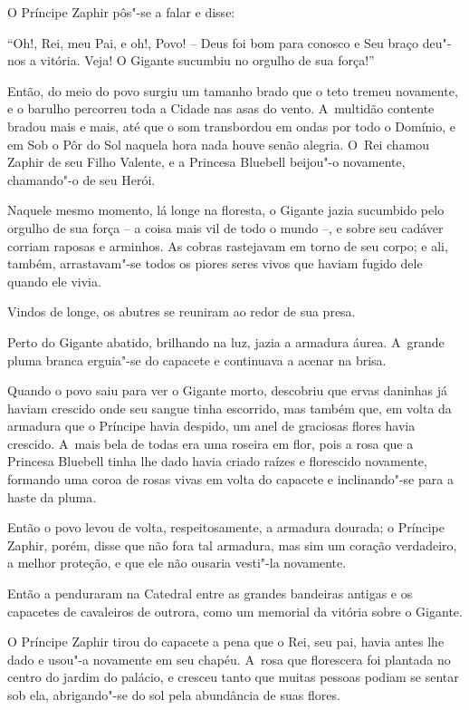 O Príncipe Zaphir pôs"-se a falar e disse:

``Oh!, Rei, meu Pai, e oh!, Povo! -- Deus foi bom para conosco e Seu
braço deu"-nos a vitória. Veja! O Gigante sucumbiu no orgulho de sua
força!''

Então, do meio do povo surgiu um tamanho brado que o teto tremeu
novamente, e o barulho percorreu toda a Cidade nas asas do vento. A~multidão contente bradou mais e mais, até que o som transbordou em ondas
por todo o Domínio, e em Sob o Pôr do Sol naquela hora nada houve senão
alegria. O~Rei chamou Zaphir de seu Filho Valente, e a Princesa Bluebell
beijou"-o novamente, chamando"-o de seu Herói.

Naquele mesmo momento, lá longe na floresta, o Gigante jazia sucumbido
pelo orgulho de sua força -- a coisa mais vil de todo o mundo --, e
sobre seu cadáver corriam raposas e arminhos. As cobras rastejavam em
torno de seu corpo; e ali, também, arrastavam"-se todos os piores seres
vivos que haviam fugido dele quando ele vivia.

Vindos de longe, os abutres se reuniram ao redor de sua presa.

Perto do Gigante abatido, brilhando na luz, jazia a armadura áurea. A~grande pluma branca erguia"-se do capacete e continuava a acenar na
brisa.

Quando o povo saiu para ver o Gigante morto, descobriu que ervas
daninhas já haviam crescido onde seu sangue tinha escorrido, mas também
que, em volta da armadura que o Príncipe havia despido, um anel de
graciosas flores havia crescido. A~mais bela de todas era uma roseira em
flor, pois a rosa que a Princesa Bluebell tinha lhe dado havia criado
raízes e florescido novamente, formando uma coroa de rosas vivas em
volta do capacete e inclinando"-se para a haste da pluma.

Então o povo levou de volta, respeitosamente, a armadura dourada; o
Príncipe Zaphir, porém, disse que não fora tal armadura, mas sim um
coração verdadeiro, a melhor proteção, e que ele não ousaria vesti"-la
novamente.

Então a penduraram na Catedral entre as grandes bandeiras antigas e os
capacetes de cavaleiros de outrora, como um memorial da vitória sobre o
Gigante.

O Príncipe Zaphir tirou do capacete a pena que o Rei, seu pai, havia
antes lhe dado e usou"-a novamente em seu chapéu. A~rosa que florescera
foi plantada no centro do jardim do palácio, e cresceu tanto que muitas
pessoas podiam se sentar sob ela, abrigando"-se do sol pela abundância de
suas flores.


